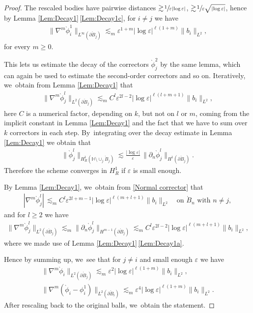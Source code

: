 \documentclass[JEP,XML,SOM,Unicode,published]{cedram}
\let\epsilon\varepsilon
\let\backslash\setminus
\theoremstyle{definition}
\newcommand\anorm[1]{\lVert #1\rVert}
\newcommand\bnorm[1]{\bigl\lVert #1\bigr\rVert}
\let\de\partial
\let\eps\epsilon
\begin{document}
\begin{proof}
The rescaled bodies have pairwise distances $\gtrsim\!\sfrac{1}{\eps|{\log\eps}|}$, \resp $\gtrsim\!\sfrac{1}{\eps\sqrt{|{\log\eps}|}}$, hence by Lemma \ref{Lem:Decay1}\,\eqref{Lem:Decay1c}, for $i\neq j$ we have
\begin{align*}
\bnorm{\nabla^m\grave{\phi}_i^1}_{L^{\infty}(\de \grave{B}_j)}\lesssim_m \eps^{1+m}|{\log\eps}|^{\ell(1+m)} \anorm{b_i}_{L^2},
\end{align*}
for every $m\geq 0$.

This lets us estimate the decay of the correctors $\grave{\phi}_j^2$ by the same lemma, which can again be used to estimate the second-order correctors and so on. Iteratively, we~obtain from Lemma \ref{Lem:Decay1} that
\begin{align}\label{Normal corrector}
\bnorm{\nabla^m\grave{\phi}_j^l}_{L^2(\de \grave{B}_j)}\lesssim_m C^l\eps^{2l-2}|{\log\eps}|^{\ell (l+m+1)} \anorm{b_i}_{L^2},
\end{align}
here $C$ is a numerical factor, depending on $k$, but not on $l$ or $m$, coming from the implicit constant in Lemma \ref{Lem:Decay1} and the fact that we have to sum over $k$ correctors in each step. By~integrating over the decay estimate in Lemma \ref{Lem:Decay1} we obtain that
\begin{align}\label{L2 corrector}
\bnorm{\grave{\phi}_j^l}_{H_R^1(\mathbb{H}\backslash\cup_j \grave{B}_j)}\lesssim \frac{|{\log\eps}|}{\eps}\,\bnorm{\de_n\grave{\phi}_j^l}_{H^1(\de \grave{B}_j)}.
\end{align}
Therefore the scheme converges in $H_R^1$ if $\eps$ is small enough.

By Lemma \ref{Lem:Decay1}, we~obtain from \eqref{Normal corrector} that
\begin{align*}
|\nabla^m \grave{\phi}_j^l|\, \lesssim_m C^l\eps^{2l+m-1}|{\log\eps}|^{\ell (m+l+1)}\anorm{b_i}_{L^2}\quad\text{on $\grave{B}_n$ with $n\neq j$},
\end{align*}
and for $l\geq2$ we have
\begin{align*}
\bnorm{\nabla^m \grave{\phi}_j^l}_{L^2(\de \grave{B}_j)}\lesssim_m \bnorm{\de_n \grave{\phi}_j^l}_{H^{m-1}(\de \grave{B}_j)}\lesssim_m C^l\eps^{2l-2}|{\log\eps}|^{\ell (m+l+1)}\anorm{b_i}_{L^2},
\end{align*}
where we made use of Lemma \ref{Lem:Decay1}\,\eqref{Lem:Decay1a}.

Hence by summing up, we~see that for $j\neq i$ and small enough $\eps$ we have
\begin{align*}
\bnorm{\nabla^m\grave{\phi}_i}_{L^2(\de \grave{B}_j)}\lesssim_m \eps^{2}|{\log\eps}|^{\ell(1+m)}\anorm{b_i}_{L^2}, \\
\bnorm{\nabla^m(\grave{\phi}_i-\phi_i^1)}_{L^2(\de \grave{B}_i)}\lesssim_m \eps^{4}|{\log\eps}|^{\ell(1+m)}\anorm{b_i}_{L^2}.
\end{align*}
After rescaling back to the original balls, we~obtain the statement.
\end{proof}
\end{document}
